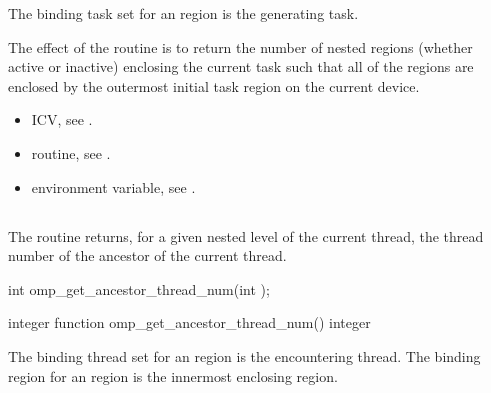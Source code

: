 \binding
The binding task set for an  region is the generating task. 

\effect
The effect of the  routine is to return the number of nested 
 regions (whether active or inactive) enclosing the current task such that all 
of the  regions are enclosed by the outermost initial task region on the 
current device.

\crossreferences
\begin{itemize}
\item {} ICV, see 
.

\item {} routine, see 
.

\item {} environment variable, see 
.
\end{itemize}










\subsection{}
\label{subsec:omp_get_ancestor_thread_num}
\summary
The  routine returns, for a given nested level of 
the current thread, the thread number of the ancestor of the current thread.

\parbox{\linewidth}{%
\format
\ccppspecificstart
\begin{boxedcode}
int omp\_get\_ancestor\_thread\_num(int );
\end{boxedcode}
\ccppspecificend}

\fortranspecificstart
\begin{boxedcode}
integer function omp\_get\_ancestor\_thread\_num()
integer 
\end{boxedcode}
\fortranspecificend

\binding
The binding thread set for an  region is the 
encountering thread. The binding region for an  
region is the innermost enclosing  region. 


